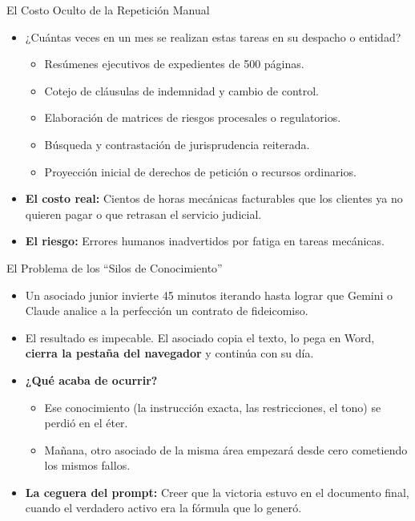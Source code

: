 \documentclass[aspectratio=169]{beamer}
\begin{document}
\begin{frame}{El Costo Oculto de la Repetición Manual}

\begin{itemize}
  \item ¿Cuántas veces en un mes se realizan estas tareas en su despacho o entidad?
  \begin{itemize}
    \item Resúmenes ejecutivos de expedientes de 500 páginas.
    \item Cotejo de cláusulas de indemnidad y cambio de control.
    \item Elaboración de matrices de riesgos procesales o regulatorios.
    \item Búsqueda y contrastación de jurisprudencia reiterada.
    \item Proyección inicial de derechos de petición o recursos ordinarios.
  \end{itemize}
  \item \textbf{El costo real:} Cientos de horas mecánicas facturables que los clientes ya no quieren pagar o que retrasan el servicio judicial.
  \item \textbf{El riesgo:} Errores humanos inadvertidos por fatiga en tareas mecánicas.
\end{itemize}
\end{frame}

\begin{frame}{El Problema de los ``Silos de Conocimiento''}

\begin{itemize}
  \item Un asociado junior invierte 45 minutos iterando hasta lograr que Gemini o Claude analice a la perfección un contrato de fideicomiso.
  \item El resultado es impecable. El asociado copia el texto, lo pega en Word, \textbf{cierra la pestaña del navegador} y continúa con su día.
  \item \textbf{¿Qué acaba de ocurrir?}
  \begin{itemize}
    \item Ese conocimiento (la instrucción exacta, las restricciones, el tono) se perdió en el éter.
    \item Mañana, otro asociado de la misma área empezará desde cero cometiendo los mismos fallos.
  \end{itemize}
  \item \textbf{La ceguera del prompt:} Creer que la victoria estuvo en el documento final, cuando el verdadero activo era la fórmula que lo generó.
\end{itemize}
\end{frame}
\end{document}
